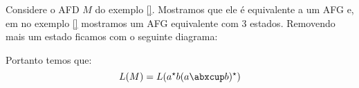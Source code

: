 \begin{example}
  Considere o AFD $M$ do exemplo \ref{}.
Mostramos que ele é equivalente a um AFG e, em no exemplo \ref{} mostramos um AFG equivalente com 3 estados.
Removendo mais um estado ficamos com o seguinte diagrama:

\begin{center}
\end{center}

Portanto temos que:
\begin{displaymath}
  L(M) = L(a^\star b(a \abxcup b)^\star)
\end{displaymath}
\end{example}

